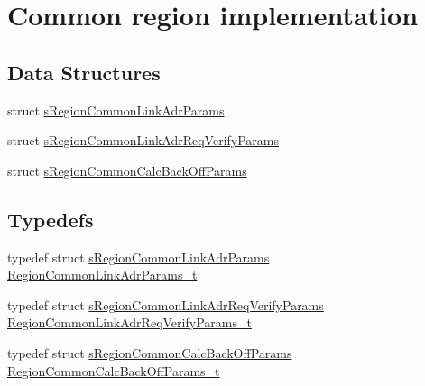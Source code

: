\hypertarget{group__REGIONCOMMON}{}\section{Common region implementation}
\label{group__REGIONCOMMON}
\subsection*{Data Structures}
\begin{DoxyCompactItemize}
\item 
struct \hyperlink{structsRegionCommonLinkAdrParams}{s\+Region\+Common\+Link\+Adr\+Params}
\item 
struct \hyperlink{structsRegionCommonLinkAdrReqVerifyParams}{s\+Region\+Common\+Link\+Adr\+Req\+Verify\+Params}
\item 
struct \hyperlink{structsRegionCommonCalcBackOffParams}{s\+Region\+Common\+Calc\+Back\+Off\+Params}
\end{DoxyCompactItemize}
\subsection*{Typedefs}
\begin{DoxyCompactItemize}
\item 
typedef struct \hyperlink{structsRegionCommonLinkAdrParams}{s\+Region\+Common\+Link\+Adr\+Params} \hyperlink{group__REGIONCOMMON_ga6e1aaa6b8d179e2daffac8d1e23d7f24}{Region\+Common\+Link\+Adr\+Params\+\_\+t}
\item 
typedef struct \hyperlink{structsRegionCommonLinkAdrReqVerifyParams}{s\+Region\+Common\+Link\+Adr\+Req\+Verify\+Params} \hyperlink{group__REGIONCOMMON_gad186afbaf1b52893ddc3fa5eba88de0a}{Region\+Common\+Link\+Adr\+Req\+Verify\+Params\+\_\+t}
\item 
typedef struct \hyperlink{structsRegionCommonCalcBackOffParams}{s\+Region\+Common\+Calc\+Back\+Off\+Params} \hyperlink{group__REGIONCOMMON_ga26c2fc7c3e1d929d59b5653a5cd1fc0c}{Region\+Common\+Calc\+Back\+Off\+Params\+\_\+t}
\end{DoxyCompactItemize}
